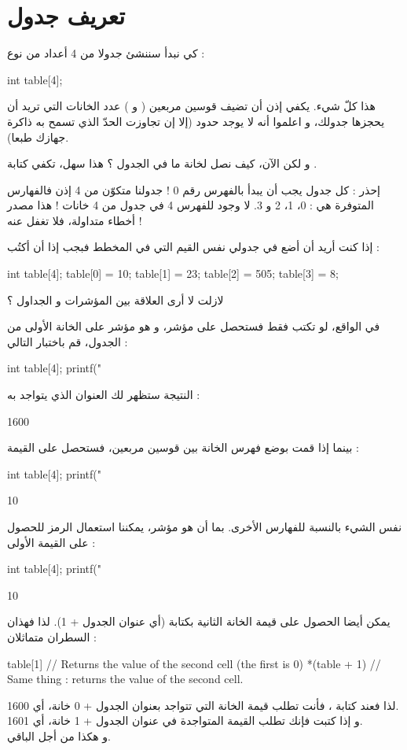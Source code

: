 \section{تعريف جدول}
كي نبدأ سننشئ جدولا من 4 أعداد من نوع
 :
\begin{Csource}
int table[4];
\end{Csource}
هذا كلّ شيء. يكفي إذن أن تضيف قوسين مربعين
(\InlineCode{[}
و
\InlineCode{]})
عدد الخانات التي تريد أن يحجزها جدولك، و اعلموا أنه لا يوجد حدود (إلا إن تجاوزت الحدّ الذي تسمح به ذاكرة جهازك طبعا).

و لكن الآن، كيف نصل لخانة ما في الجدول ؟
هذا سهل، تكفي كتابة
.
\begin{critical}
  إحذر : كل جدول يجب أن يبدأ بالفهرس رقم 0 ! جدولنا متكوّن من 4
إذن فالفهارس المتوفرة هي : 0، 1، 2 و 3. لا وجود للفهرس 4 في جدول من 4 خانات ! هذا مصدر أخطاء متداولة، فلا تغفل عنه !
\end{critical}
إذا كنت أريد أن أضع في جدولي نفس القيم التي في المخطط فبجب إذا أن أكتُب :
\begin{Csource}
int table[4];
table[0] = 10;
table[1] = 23;
table[2] = 505;
table[3] = 8;
\end{Csource}
\begin{question}
  لازلت لا أرى العلاقة بين المؤشرات و الجداول ؟
\end{question}
في الواقع، لو تكتب فقط
فستحصل على مؤشر، و هو مؤشر على الخانة الأولى من الجدول، قم باختبار التالي :
\begin{Csource}
int table[4];
printf("%
\end{Csource}
النتيجة ستظهر لك العنوان الذي يتواجد به
 :
\begin{Console}
1600
\end{Console}
بينما إذا قمت بوضع فهرس الخانة بين قوسين مربعين، فستحصل على القيمة :
\begin{Csource}
int table[4];
printf("%
\end{Csource}
\begin{Console}
10
\end{Console}
نفس الشيء بالنسبة للفهارس الأخرى. بما أن
هو مؤشر، يمكننا استعمال الرمز
\InlineCode{*}
للحصول على القيمة الأولى :
\begin{Csource}
int table[4];
printf("%
\end{Csource}
\begin{Console}
10
\end{Console}
يمكن أيضا الحصول على قيمة الخانة الثانية بكتابة
(أي عنوان الجدول + 1). لذا فهذان السطران متماثلان :
\begin{Csource}
table[1] // Returns the value of the second cell (the first is 0)
*(table + 1) // Same thing : returns the value of the second cell.
\end{Csource}
لذا فعند كتابة
،
فأنت تطلب قيمة الخانة التي تتواجد بعنوان الجدول + 0
خانة، أي 1600.\\
و إذا كتبت
فإنك تطلب القيمة المتواجدة في عنوان الجدول + 1
خانة، أي 1601.\\
و هكذا من أجل الباقي.

